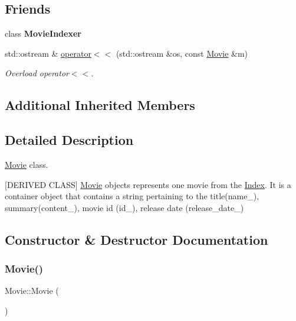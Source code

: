 \subsection*{Friends}
\begin{DoxyCompactItemize}
\item 
\mbox{\label{class_movie_a0675564ad66cfa7f2eff3b44c1f1b2cc}} 
class {\bfseries Movie\+Indexer}
\item 
std\+::ostream \& \hyperlink{class_movie_ad206ecf2beecb9cdf5f22d316a5930b5}{operator$<$$<$} (std\+::ostream \&os, const \hyperlink{class_movie}{Movie} \&m)
\begin{DoxyCompactList}\small\item\em Overload operator$<$$<$. \end{DoxyCompactList}\end{DoxyCompactItemize}
\subsection*{Additional Inherited Members}


\subsection{Detailed Description}
\hyperlink{class_movie}{Movie} class. 

\mbox{[}D\+E\+R\+I\+V\+ED C\+L\+A\+SS\mbox{]} \hyperlink{class_movie}{Movie} objects represents one movie from the \hyperlink{class_index}{Index}. It is a container object that contains a string pertaining to the title(name\+\_\+), summary(content\+\_\+), movie id (id\+\_\+), release date (release\+\_\+date\+\_\+) 

\subsection{Constructor \& Destructor Documentation}
\mbox{\label{class_movie_a62d82e9e61d6349ae66a73d0af6667ac}} 
\subsubsection{\texorpdfstring{Movie()}{Movie()}\hspace{0.1cm}{\footnotesize\ttfamily [1/2]}}
{\footnotesize\ttfamily Movie\+::\+Movie (\begin{DoxyParamCaption}{ }\end{DoxyParamCaption})\hspace{0.3cm}{\ttfamily [inline]}}



